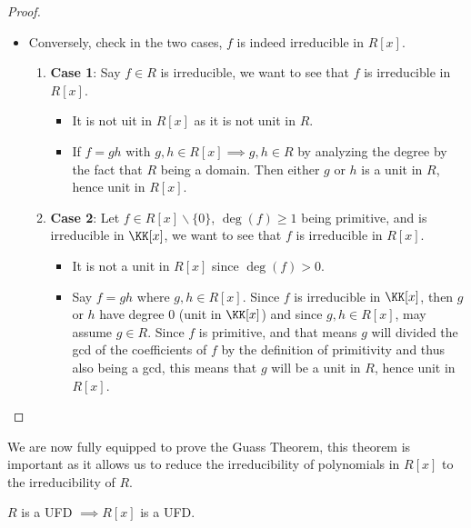\begin{proof}
\begin{itemize}
\begin{enumerate}
		      \end{enumerate}
		\item Conversely, check in the two cases, \( f \) is indeed irreducible in \( R[x] \).
		      \begin{enumerate}
			      \item \textbf{Case 1}: Say \( f \in R \) is irreducible, we want to see that \( f \) is
			            irreducible in \( R[x] \).
			            \begin{itemize}
				            \item It is not uit in \( R[x] \) as it is not unit in \( R \).
				            \item If \( f = gh \) with \( g,h \in R[x] \implies g,h \in R \) by analyzing the degree
				                  by the fact that \( R \) being a domain. Then either \( g \) or \( h \) is a unit in
				                  \( R \), hence unit in \( R[x] \).
			            \end{itemize}
			      \item \textbf{Case 2}: Let \( f\in R[x] \backslash \{0\} \), \( \deg(f) \geq 1 \)
			            being primitive, and is irreducible in \( \KK[x] \), we want to see that \( f \)
			            is irreducible in \( R[x] \).
			            \begin{itemize}
				            \item It is not a unit in \( R[x] \) since \( \deg(f) > 0 \).
				            \item Say \( f = gh \) where \( g,h \in R[x] \). Since \( f \) is irreducible in
				                  \( \KK[x] \), then \( g \) or \( h \) have degree \( 0 \) (unit in \( \KK[x] \))
				                  and since \( g,h \in R[x] \), may assume \( g \in R \). Since \( f \) is
				                  primitive, and that means \( g \) will divided the gcd of the coefficients of \(
				                  f\) by the definition of primitivity and thus also being a gcd, this means that \( g \) will be a unit in \( R \), hence unit in \( R[x] \).
			            \end{itemize}
		      \end{enumerate}
	\end{itemize}
\end{proof}
We are now fully equipped to prove the Guass Theorem, this theorem is important as it allows us to
reduce the irreducibility of polynomials in \( R[x] \) to the irreducibility of \( R \).

\begin{theorem}
	\( R \) is a UFD \( \implies R[x] \) is a UFD.
\end{theorem}


